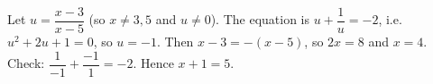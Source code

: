 Let $u=\dfrac{x-3}{x-5}$ (so $x\ne3,5$ and $u\ne0$). The equation is $u+\dfrac1u=-2$, i.e. $u^2+2u+1=0$, so $u=-1$. Then $x-3=-(x-5)$, so $2x=8$ and $x=4$. Check: $\dfrac{1}{-1}+\dfrac{-1}{1}=-2$. Hence $x+1=\boxed{5}$.
